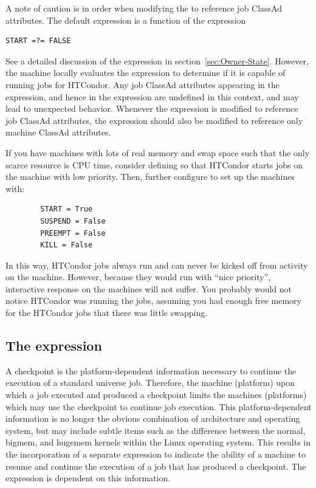 A note of caution is in order when modifying the  to
reference job ClassAd attributes.  The default 
expression is a function of the  expression
\begin{verbatim}
START =?= FALSE
\end{verbatim}
See a detailed discussion of the  expression in
section~\ref{sec:Owner-State}.  However, the machine locally
evaluates the  expression to determine if it is
capable of running jobs for HTCondor.  Any job ClassAd attributes
appearing in the  expression, and hence in the
 expression are undefined in this context, and may
lead to unexpected behavior.  Whenever the  expression
is modified to reference job ClassAd attributes, the
 expression should also be modified to reference
only machine ClassAd attributes.

\Note If you have machines with lots of real memory and swap space such
that the only scarce resource is CPU time, consider
defining  
so that HTCondor starts jobs on the machine with low priority.
Then, further configure to set up the machines with:
\begin{verbatim}
        START = True
        SUSPEND = False
        PREEMPT = False
        KILL = False
\end{verbatim}
In this way, HTCondor jobs always run and can never be kicked off
from activity on the machine. 
However, because they would run with ``nice priority'', interactive 
response on the machines will not suffer.
You probably would not notice HTCondor was running the jobs, 
assuming you had enough free memory for the HTCondor jobs that there
was little swapping.

\subsection{\label{sec:Is-Valid-Checkpoint-Platform}The  expression}

A checkpoint is the platform-dependent information necessary
to continue the execution of a standard universe job.
Therefore, the machine (platform) upon which a job executed
and produced a checkpoint limits the machines (platforms)
which may use the checkpoint to continue job execution.
This platform-dependent information is no longer
the obvious combination of architecture and operating system, 
but may include subtle items such as the 
difference between the normal, bigmem, and hugemem kernels
within the Linux operating system.
This results in the incorporation of a separate
expression to indicate the ability of a machine to
resume and continue the execution of a job that has produced
a checkpoint.
The  expression is dependent on this information.


